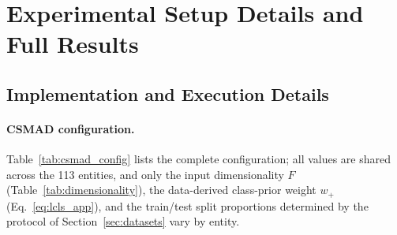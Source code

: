 
\section{Experimental Setup Details and Full Results}
\label{sec:appendix_setup}

\subsection{Implementation and Execution Details}
\label{sec:appendix_impl}

\paragraph{CSMAD configuration.}
Table~\ref{tab:csmad_config} lists the complete configuration; all values are shared across the
113 entities, and only the input dimensionality $F$ (Table~\ref{tab:dimensionality}), the
data-derived class-prior weight $w_+$ (Eq.~\ref{eq:lcls_app}), and the train/test split
proportions determined by the protocol of Section~\ref{sec:datasets} vary by entity.

